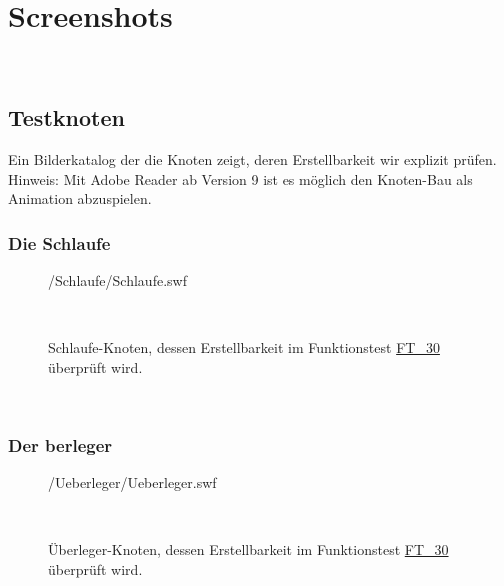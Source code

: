 %



\section{Screenshots}
\label{Anhang:Aufnahmen}


~\\



\newpage




\subsection{Testknoten}

Ein Bilderkatalog der die Knoten zeigt, deren Erstellbarkeit wir explizit prüfen. Hinweis: Mit Adobe Reader ab Version 9 ist es möglich den Knoten-Bau als Animation abzuspielen.\\


	\subsubsection*{Die \glqq Schlaufe\grqq}	
	
		\begin{figure}[!h]
		
			\label{Abb:Test-Bau-Knoten:Schlaufe}
			\centering	
			
			{\testknots/Schlaufe/Schlaufe.swf}
			
			~\\
	
			\caption{Schlaufe-Knoten, dessen Erstellbarkeit im Funktionstest \hyperref[FT:30:1]{FT\_30} überprüft wird. }
	
		\end{figure}
		
		~\\
	
	
\clearpage	


	\subsubsection*{Der berleger\grqq}
	
	
		\begin{figure}[!h]
		
			\label{Abb:Test-Bau-Knoten:Ueberleger}
			\centering	
			
			{\testknots/Ueberleger/Ueberleger.swf}
			
			~\\
	
			\caption{Überleger-Knoten, dessen Erstellbarkeit im Funktionstest \hyperref[FT:30:2]{FT\_30} überprüft wird. }
	
		\end{figure}
		
